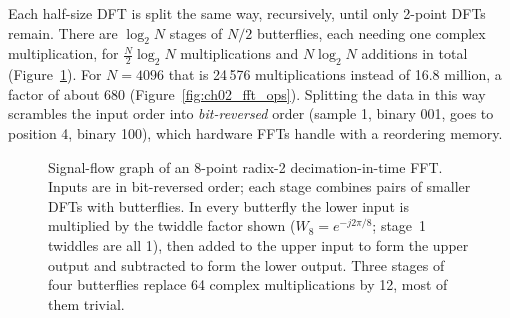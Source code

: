 Each half-size DFT is split the same way, recursively, until only 2-point DFTs remain. There are
$\log_2N$ stages of $N/2$ butterflies, each needing one complex multiplication, for
$\frac N2\log_2N$ multiplications and $N\log_2N$ additions in total (Figure~\ref{fig:ch02_butterfly}).
For $N=4096$ that is 24\,576 multiplications instead of 16.8 million, a factor of about 680
(Figure~\ref{fig:ch02_fft_ops}). Splitting the data in this way scrambles the input order into
\emph{bit-reversed} order (sample 1, binary 001, goes to position 4, binary 100), which hardware FFTs
handle with a reordering memory.

\begin{figure}[htbp]\centering
{}
\caption{Signal-flow graph of an 8-point radix-2 decimation-in-time FFT. Inputs are in bit-reversed
order; each stage combines pairs of smaller DFTs with butterflies. In every butterfly the lower input
is multiplied by the twiddle factor shown ($W_8=e^{-j2\pi/8}$; stage~1 twiddles are all 1), then
added to the upper input to form the upper output and subtracted to form the lower output. Three
stages of four butterflies replace 64 complex multiplications by 12, most of them trivial.}
\label{fig:ch02_butterfly}
\end{figure}

